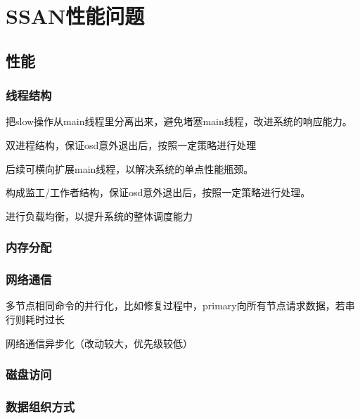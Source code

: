 \chapter{SSAN性能问题}

\section{性能}

\subsection{线程结构}

\begin{enumbox}
\item 把slow操作从main线程里分离出来，避免堵塞main线程，改进系统的响应能力。
\item 双进程结构，保证osd意外退出后，按照一定策略进行处理
\item 后续可横向扩展main线程，以解决系统的单点性能瓶颈。
\end{enumbox}

构成监工/工作者结构，保证osd意外退出后，按照一定策略进行处理。

进行负载均衡，以提升系统的整体调度能力

\subsection{内存分配}


\subsection{网络通信}

\begin{enumbox}
\item 多节点相同命令的并行化，比如修复过程中，primary向所有节点请求数据，若串行则耗时过长
\item 网络通信异步化（改动较大，优先级较低）
\end{enumbox}


\subsection{磁盘访问}


\subsection{数据组织方式}

